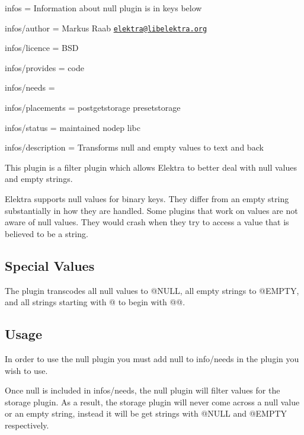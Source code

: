 
\begin{DoxyItemize}
\item infos = Information about null plugin is in keys below
\item infos/author = Markus Raab \href{mailto:elektra@libelektra.org}{\tt elektra@libelektra.\+org}
\item infos/licence = B\+S\+D
\item infos/provides = code
\item infos/needs =
\item infos/placements = postgetstorage presetstorage
\item infos/status = maintained nodep libc
\item infos/description = Transforms null and empty values to text and back
\end{DoxyItemize}

This plugin is a filter plugin which allows Elektra to better deal with null values and empty strings.

Elektra supports null values for binary keys. They differ from an empty string substantially in how they are handled. Some plugins that work on values are not aware of null values. They would crash when they try to access a value that is believed to be a string.

\subsection*{Special Values}

The plugin transcodes all null values to {\ttfamily @N\+U\+L\+L}, all empty strings to {\ttfamily @E\+M\+P\+T\+Y}, and all strings starting with {\ttfamily @} to begin with {\ttfamily @@}.

\subsection*{Usage}

In order to use the {\ttfamily null} plugin you must add {\ttfamily null} to {\ttfamily info/needs} in the plugin you wish to use.

Once {\ttfamily null} is included in {\ttfamily infos/needs}, the null plugin will filter values for the storage plugin. As a result, the storage plugin will never come across a null value or an empty string, instead it will be get strings with {\ttfamily @N\+U\+L\+L} and {\ttfamily @E\+M\+P\+T\+Y} respectively. 